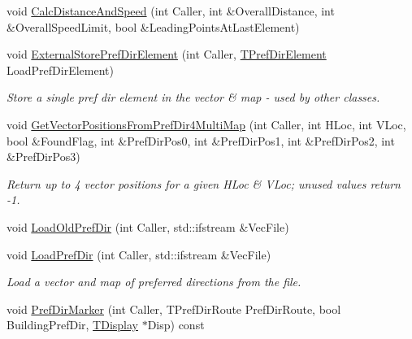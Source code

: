 \begin{DoxyCompactItemize}
void \mbox{\hyperlink{class_t_one_pref_dir_abadb0c99b24d6dbfda371d96b308fc6e}{Calc\+Distance\+And\+Speed}} (int Caller, int \&Overall\+Distance, int \&Overall\+Speed\+Limit, bool \&Leading\+Points\+At\+Last\+Element)
\item 
\mbox{\label{class_t_one_pref_dir_a5e8d14c19c70cafe968e7481b116a714}} 
void \mbox{\hyperlink{class_t_one_pref_dir_a5e8d14c19c70cafe968e7481b116a714}{External\+Store\+Pref\+Dir\+Element}} (int Caller, \mbox{\hyperlink{class_t_pref_dir_element}{T\+Pref\+Dir\+Element}} Load\+Pref\+Dir\+Element)
\begin{DoxyCompactList}\small\item\em Store a single pref dir element in the vector \& map -\/ used by other classes. \end{DoxyCompactList}\item 
\mbox{\label{class_t_one_pref_dir_a820f6cc109de519289e6a63dac835ebc}} 
void \mbox{\hyperlink{class_t_one_pref_dir_a820f6cc109de519289e6a63dac835ebc}{Get\+Vector\+Positions\+From\+Pref\+Dir4\+Multi\+Map}} (int Caller, int H\+Loc, int V\+Loc, bool \&Found\+Flag, int \&Pref\+Dir\+Pos0, int \&Pref\+Dir\+Pos1, int \&Pref\+Dir\+Pos2, int \&Pref\+Dir\+Pos3)
\begin{DoxyCompactList}\small\item\em Return up to 4 vector positions for a given H\+Loc \& V\+Loc; unused values return -\/1. \end{DoxyCompactList}\item 
void \mbox{\hyperlink{class_t_one_pref_dir_a614933ff3958e4b8c9be9bc78159d9e8}{Load\+Old\+Pref\+Dir}} (int Caller, std\+::ifstream \&Vec\+File)
\item 
\mbox{\label{class_t_one_pref_dir_a0779c9edd1ba268356590aac4719166d}} 
void \mbox{\hyperlink{class_t_one_pref_dir_a0779c9edd1ba268356590aac4719166d}{Load\+Pref\+Dir}} (int Caller, std\+::ifstream \&Vec\+File)
\begin{DoxyCompactList}\small\item\em Load a vector and map of preferred directions from the file. \end{DoxyCompactList}\item 
void \mbox{\hyperlink{class_t_one_pref_dir_aef8388386635d73a921fae7ce43f5214}{Pref\+Dir\+Marker}} (int Caller, T\+Pref\+Dir\+Route Pref\+Dir\+Route, bool Building\+Pref\+Dir, \mbox{\hyperlink{class_t_display}{T\+Display}} $\ast$Disp) const

\end{DoxyCompactItemize}
